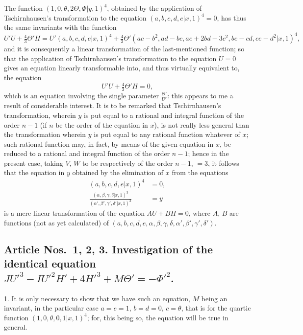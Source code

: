 \documentclass[11pt,a4paper]{article}
\theoremstyle{plain}
\begin{document}
The function $(1, 0, \theta, 2\Theta, \Phi  |  y, 1)^4$, obtained by the application of Tschirnhausen's transformation to the equation $(a,b,c,d,e  |  x, 1)^4 = 0$, has thus the same invariants with the function
\[
U'U + \tfrac43\Theta'H = U'(a,b,c,d,e  |  x, 1)^4 + \tfrac43\Theta'(ac-b^2, ad-bc, ae+2bd-3c^2, be-cd, ce-d^2  |  x, 1)^4,
\]
and it is consequently a linear transformation of the last-mentioned function; so that the application of Tschirnhausen's transformation to the equation $U = 0$ gives an equation linearly transformable into, and thus virtually equivalent to, the equation
\[
U'U + \tfrac43\Theta'H = 0,
\]
which is an equation involving the single parameter $\frac{\Theta'}{U'}$: this appears to me a result of considerable interest. It is to be remarked that Tschirnhausen's transformation, wherein $y$ is put equal to a rational and integral function of the order $n-1$ (if $n$ be the order of the equation in $x$), is not really less general than the transformation wherein $y$ is put equal to any rational function whatever of $x$; such rational function may, in fact, by means of the given equation in $x$, be reduced to a rational and integral function of the order $n-1$; hence in the present case, taking $V$, $W$ to be respectively of the order $n-1$, $=3$, it follows that the equation in $y$ obtained by the elimination of $x$ from the equations
\begin{align*}
(a,b,c,d,e  |  x, 1)^4 &= 0, \\
\frac{(\alpha, \beta, \gamma, \delta  |  x, 1)^3}{(\alpha', \beta', \gamma', \delta'  |  x, 1)^3} &= y
\end{align*}
is a mere linear transformation of the equation $AU + BH = 0$, where $A$, $B$ are functions (not as yet calculated) of $(a, b, c, d, e, \alpha, \beta, \gamma, \delta, \alpha', \beta', \gamma', \delta')$.

\subsection*{Article Nos.~1, 2, 3. Investigation of the identical equation $JU'^3 - IU'^2H' + 4H'^3 + M\Theta' = -\Phi'^2$.}

1. It is only necessary to show that we have such an equation, $M$ being an invariant, in the particular case $a=e=1$, $b=d=0$, $c=\theta$, that is for the quartic function $(1, 0, \theta, 0, 1  |  x, 1)^4$; for, this being so, the equation will be true in general.
\end{document}
